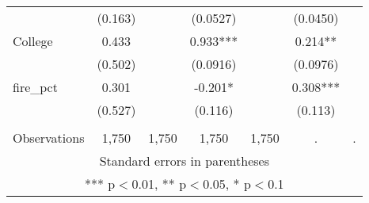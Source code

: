 \begin{tabular}{lcccccc}
 & (0.163) &  & (0.0527) &  & (0.0450) &  \\
College & 0.433 &  & 0.933*** &  & 0.214** &  \\
 & (0.502) &  & (0.0916) &  & (0.0976) &  \\
fire\_pct & 0.301 &  & -0.201* &  & 0.308*** &  \\
 & (0.527) &  & (0.116) &  & (0.113) &  \\
 &  &  &  &  &  &  \\
 Observations & 1,750 & 1,750 & 1,750 & 1,750 & . & . \\ \hline
\multicolumn{7}{c}{ Standard errors in parentheses} \\
\multicolumn{7}{c}{ *** p$<$0.01, ** p$<$0.05, * p$<$0.1} \\
\end{tabular}
